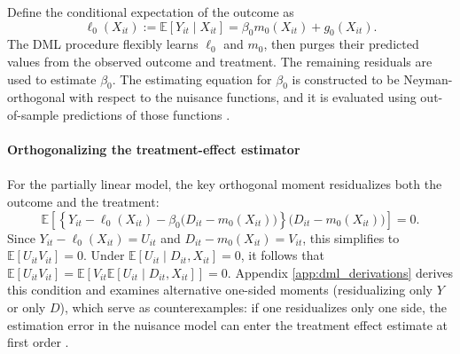 \documentclass[11pt,oneside,a4paper]{book}
\begin{document}
Define the conditional expectation of the outcome as
\begin{equation*}
\ell_0(X_{it})
:=
\mathbb{E}[Y_{it}\mid X_{it}]
=
\beta_0m_0(X_{it})+g_0(X_{it}).
\end{equation*}
The DML procedure flexibly learns \(\ell_0\) and \(m_0\), then purges their predicted values from the observed outcome and treatment. The remaining residuals are used to estimate \(\beta_0\). The estimating equation for \(\beta_0\) is constructed to be Neyman-orthogonal with respect to the nuisance functions, and it is evaluated using out-of-sample predictions of those functions \citep{chernozhukov2018dml,bach2024doubleml,helal2026returns}.\\
\\
\textbf{Orthogonalizing the treatment-effect estimator}\\
\\
For the partially linear model, the key orthogonal moment residualizes both the outcome and the treatment:
\begin{equation}
\mathbb{E}\!\left[
\left\{
Y_{it}-\ell_0(X_{it})
-\beta_0\bigl(D_{it}-m_0(X_{it})\bigr)
\right\}
\bigl(D_{it}-m_0(X_{it})\bigr)
\right]
=0.
\label{eq:dml_third_moment}
\end{equation}
Since \(Y_{it}-\ell_0(X_{it}) = U_{it}\) and \(D_{it}-m_0(X_{it}) = V_{it}\), this simplifies to \(\mathbb{E}[U_{it}V_{it}] = 0\).  Under \(\mathbb{E}[U_{it}\mid D_{it},X_{it}]=0\), it follows that \(\mathbb{E}[U_{it}V_{it}] = \mathbb{E}[V_{it}\mathbb{E}[U_{it}\mid D_{it},X_{it}]] = 0\). Appendix \ref{app:dml_derivations} derives this condition and examines alternative one-sided moments (residualizing only \(Y\) or only \(D\)), which serve as counterexamples: if one residualizes only one side, the estimation error in the nuisance model can enter the treatment effect estimate at first order \citep{chernozhukov2018dml}.
\end{document}
